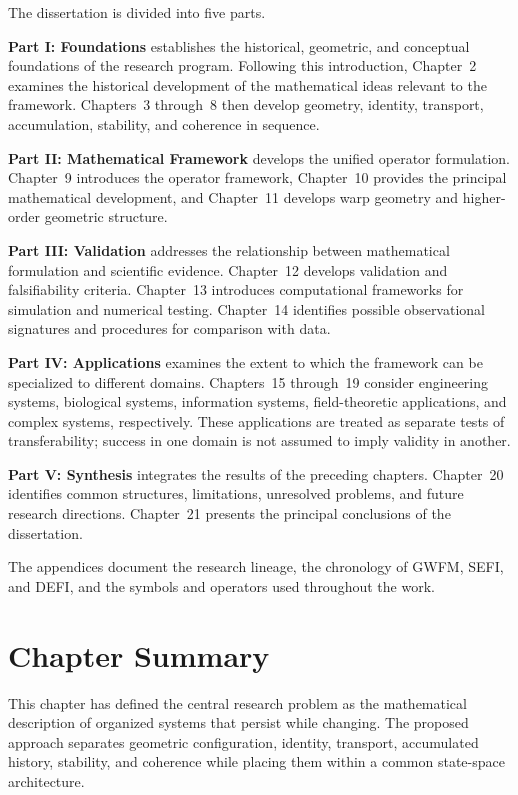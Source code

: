 \documentclass[12pt,oneside]{book}
\begin{document}
The dissertation is divided into five parts.

\textbf{Part I: Foundations} establishes the historical,
geometric, and conceptual foundations of the research program.
Following this introduction, Chapter~2 examines the historical
development of the mathematical ideas relevant to the
framework. Chapters~3 through~8 then develop geometry,
identity, transport, accumulation, stability, and coherence in
sequence.

\textbf{Part II: Mathematical Framework} develops the unified
operator formulation. Chapter~9 introduces the operator
framework, Chapter~10 provides the principal mathematical
development, and Chapter~11 develops warp geometry and
higher-order geometric structure.

\textbf{Part III: Validation} addresses the relationship
between mathematical formulation and scientific evidence.
Chapter~12 develops validation and falsifiability criteria.
Chapter~13 introduces computational frameworks for simulation
and numerical testing. Chapter~14 identifies possible
observational signatures and procedures for comparison with
data.

\textbf{Part IV: Applications} examines the extent to which the
framework can be specialized to different domains.
Chapters~15 through~19 consider engineering systems,
biological systems, information systems, field-theoretic
applications, and complex systems, respectively. These
applications are treated as separate tests of transferability;
success in one domain is not assumed to imply validity in
another.

\textbf{Part V: Synthesis} integrates the results of the
preceding chapters. Chapter~20 identifies common structures,
limitations, unresolved problems, and future research
directions. Chapter~21 presents the principal conclusions of
the dissertation.

The appendices document the research lineage, the chronology of
GWFM, SEFI, and DEFI, and the symbols and operators used
throughout the work.


\section{Chapter Summary}
\label{sec:chapter-one-summary}

This chapter has defined the central research problem as the
mathematical description of organized systems that persist
while changing. The proposed approach separates geometric
configuration, identity, transport, accumulated history,
stability, and coherence while placing them within a common
state-space architecture.
\end{document}

